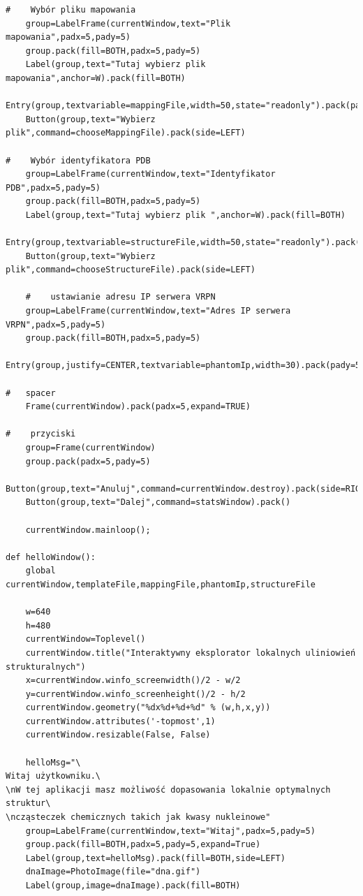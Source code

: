\documentclass[licencjacka]{pracamgr}
\begin{document}
\begin{lstlisting}
#    Wybór pliku mapowania
    group=LabelFrame(currentWindow,text="Plik mapowania",padx=5,pady=5)
    group.pack(fill=BOTH,padx=5,pady=5)
    Label(group,text="Tutaj wybierz plik mapowania",anchor=W).pack(fill=BOTH)
    Entry(group,textvariable=mappingFile,width=50,state="readonly").pack(pady=5,side=LEFT)
    Button(group,text="Wybierz plik",command=chooseMappingFile).pack(side=LEFT)
    
#    Wybór identyfikatora PDB
    group=LabelFrame(currentWindow,text="Identyfikator PDB",padx=5,pady=5)
    group.pack(fill=BOTH,padx=5,pady=5)
    Label(group,text="Tutaj wybierz plik ",anchor=W).pack(fill=BOTH)
    Entry(group,textvariable=structureFile,width=50,state="readonly").pack(pady=5,side=LEFT)
    Button(group,text="Wybierz plik",command=chooseStructureFile).pack(side=LEFT)
    
    #    ustawianie adresu IP serwera VRPN
    group=LabelFrame(currentWindow,text="Adres IP serwera VRPN",padx=5,pady=5)
    group.pack(fill=BOTH,padx=5,pady=5)
    Entry(group,justify=CENTER,textvariable=phantomIp,width=30).pack(pady=5,side=LEFT)

#   spacer
    Frame(currentWindow).pack(padx=5,expand=TRUE)
    
#    przyciski
    group=Frame(currentWindow)
    group.pack(padx=5,pady=5)
    Button(group,text="Anuluj",command=currentWindow.destroy).pack(side=RIGHT)
    Button(group,text="Dalej",command=statsWindow).pack()
    
    currentWindow.mainloop();
    
def helloWindow():
    global currentWindow,templateFile,mappingFile,phantomIp,structureFile
    
    w=640
    h=480
    currentWindow=Toplevel()
    currentWindow.title("Interaktywny eksplorator lokalnych uliniowień strukturalnych")
    x=currentWindow.winfo_screenwidth()/2 - w/2
    y=currentWindow.winfo_screenheight()/2 - h/2
    currentWindow.geometry("%dx%d+%d+%d" % (w,h,x,y))
    currentWindow.attributes('-topmost',1)
    currentWindow.resizable(False, False)
    
    helloMsg="\
Witaj użytkowniku.\
\nW tej aplikacji masz możliwość dopasowania lokalnie optymalnych struktur\
\ncząsteczek chemicznych takich jak kwasy nukleinowe"
    group=LabelFrame(currentWindow,text="Witaj",padx=5,pady=5)
    group.pack(fill=BOTH,padx=5,pady=5,expand=True)
    Label(group,text=helloMsg).pack(fill=BOTH,side=LEFT)
    dnaImage=PhotoImage(file="dna.gif")
    Label(group,image=dnaImage).pack(fill=BOTH)
    

\end{lstlisting}
\end{document}
